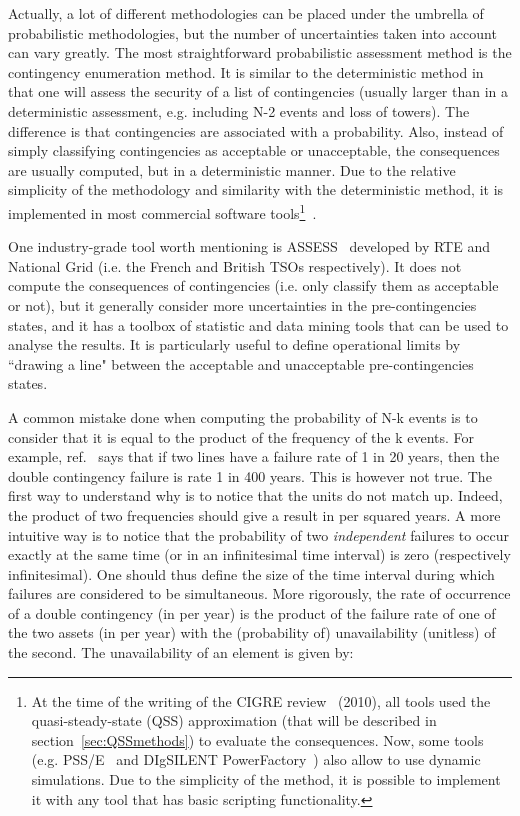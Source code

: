 Actually, a lot of different methodologies can be placed under the umbrella of probabilistic methodologies, but the number of uncertainties taken into account can vary greatly. The most straightforward probabilistic assessment method is the contingency enumeration method. It is similar to the deterministic method in that one will assess the security of a list of contingencies (usually larger than in a deterministic assessment, e.g. including N-2 events and loss of towers). The difference is that contingencies are associated with a probability. Also, instead of simply classifying contingencies as acceptable or unacceptable, the consequences are usually computed, but in a deterministic manner. Due to the relative simplicity of the methodology and similarity with the deterministic method, it is implemented in most commercial software tools\footnote{At the time of the writing of the CIGRE review~\cite{CIGREreviewOfTools} (2010), all tools used the quasi-steady-state (QSS) approximation (that will be described in section~\ref{sec:QSSmethods}) to evaluate the consequences. Now, some tools (e.g. PSS/E~\cite{PSSE} and DIgSILENT PowerFactory~\cite{PowerFactory}) also allow to use dynamic simulations. Due to the simplicity of the method, it is possible to implement it with any tool that has basic scripting functionality.}~\cite{CIGREreviewOfTools}.

One industry-grade tool worth mentioning is ASSESS~\cite{AssessRTE, AssessNationalGrid} developed by RTE and National Grid (i.e. the French and British TSOs respectively). It does not compute the consequences of contingencies (i.e. only classify them as acceptable or not), but it generally consider more uncertainties in the pre-contingencies states, and it has a toolbox of statistic and data mining tools that can be used to analyse the results. It is particularly useful to define operational limits by ``drawing a line" between the acceptable and unacceptable pre-contingencies states.


A common mistake done when computing the probability of N-k events is to consider that it is equal to the product of the frequency of the k events. For example, ref.~\cite{CIGREreviewOfTools} says that if two lines have a failure rate of 1 in 20 years, then the double contingency failure is rate 1 in 400 years. This is however not true. The first way to understand why is to notice that the units do not match up. Indeed, the product of two frequencies should give a result in per squared years. A more intuitive way is to notice that the probability of two \textit{independent} failures to occur exactly at the same time (or in an infinitesimal time interval) is zero (respectively infinitesimal). One should thus define the size of the time interval during which failures are considered to be simultaneous. More rigorously, the rate of occurrence of a double contingency (in per year) is the product of the failure rate of one of the two assets (in per year) with the (probability of) unavailability (unitless) of the second. The unavailability of an element is given by:

